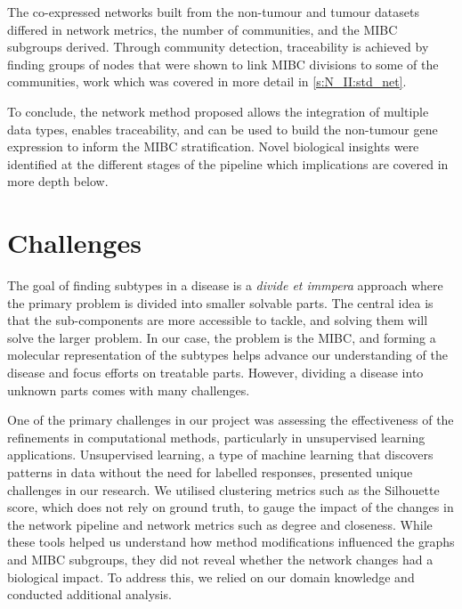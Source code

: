 The co-expressed networks built from the non-tumour and tumour datasets differed in network metrics, the number of communities, and the MIBC subgroups derived. Through community detection, traceability is achieved by finding groups of nodes that were shown to link MIBC divisions to some of the communities, work which was covered in more detail in \cref{s:N_II:std_net}.

% 
To conclude, the network method proposed allows the integration of multiple data types, enables traceability, and can be used to build the non-tumour gene expression to inform the MIBC stratification. Novel biological insights were identified at the different stages of the pipeline which implications are covered in more depth below.

\section{Challenges}

The goal of finding subtypes in a disease is a \textit{divide et immpera} approach where the primary problem is divided into smaller solvable parts. The central idea is that the sub-components are more accessible to tackle, and solving them will solve the larger problem. In our case, the problem is the MIBC, and forming a molecular representation of the subtypes helps advance our understanding of the disease and focus efforts on treatable parts. However, dividing a disease into unknown parts comes with many challenges. 

One of the primary challenges in our project was assessing the effectiveness of the refinements in computational methods, particularly in unsupervised learning applications. Unsupervised learning, a type of machine learning that discovers patterns in data without the need for labelled responses, presented unique challenges in our research. We utilised clustering metrics such as the Silhouette score, which does not rely on ground truth, to gauge the impact of the changes in the network pipeline and network metrics such as degree and closeness. While these tools helped us understand how method modifications influenced the graphs and MIBC subgroups, they did not reveal whether the network changes had a biological impact. To address this, we relied on our domain knowledge and conducted additional analysis.


